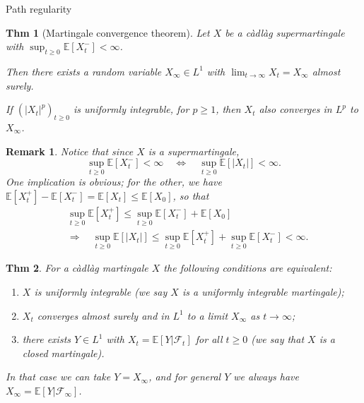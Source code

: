 \documentclass[a4paper]{article}
\theoremstyle{mytheoremstyle}
\newtheorem{theorem}{Thm}
\newtheorem*{remark}{Remark}
\newcommand{\1}{\mathds{1}}
\begin{document}
\begin{multicols*}{3}
\begin{roundbox}{Path regularity}
\begin{theorem}[Martingale convergence theorem]
  \label{prop:supermartingale convergence}Let $X$ be a c{\`a}dl{\`a}g
  supermartingale with $\sup_{t \geqslant 0} \mathbb{E} [X_t^-] < \infty$.
  
  Then there exists a random variable $X_{\infty} \in L^1$ with $\lim_{t
  \rightarrow \infty} X_t = X_{\infty}$ almost surely.
  
  If $(| X_t |^p)_{t \geqslant 0}$ is uniformly integrable, for $p \geqslant
  1$, then $X_t$ also converges in $L^p$ to $X_{\infty}$.
\end{theorem}

\begin{remark}
  Notice that since $X$ is a supermartingale,
  \[
    \sup_{t \geqslant 0} \mathbb{E} [X_t^-] < \infty \quad \Leftrightarrow
     \quad \sup_{t \geqslant 0} \mathbb{E} [| X_t |] < \infty .
   \]
  One implication is obvious; for the other, we have $\mathbb{E} [X^+_t]
  -\mathbb{E} [X^-_t] =\mathbb{E} [X_t] \leqslant \mathbb{E} [X_0]$, so that
  \begin{align*}
      & \sup_{t \geqslant 0} \mathbb{E} [X^+_t] \leqslant \sup_{t \geqslant 0}
     \mathbb{E} [X_t^-] +\mathbb{E} [X_0] \\
     & \Rightarrow \quad \sup_{t
     \geqslant 0} \mathbb{E} [| X_t |] \leqslant \sup_{t \geqslant 0}
     \mathbb{E} [X^+_t] + \sup_{t \geqslant 0} \mathbb{E} [X_t^-] < \infty .
 \end{align*}
\end{remark}

\begin{theorem}
  For a c{\`a}dl{\`a}g martingale $X$ the following conditions are equivalent:
  \begin{enumerate}
    \item $X$ is uniformly integrable (we say $X$ is a {\emph{uniformly
    integrable martingale}});
    
    \item $X_t$ converges almost surely and in $L^1$ to a limit $X_{\infty}$
    as $t \rightarrow \infty$;
    
    \item there exists $Y \in L^1$ with $X_t =\mathbb{E} [Y|\mathcal{F}_t]$
    for all $t \geqslant 0$ (we say that $X$ is a {\emph{closed martingale}}).
  \end{enumerate}
  In that case we can take $Y = X_{\infty}$, and for general $Y$ we always
  have $X_{\infty} =\mathbb{E} [Y|\mathcal{F}_{\infty}]$.
\end{theorem}


\end{roundbox}
\end{multicols*}
\end{document}
